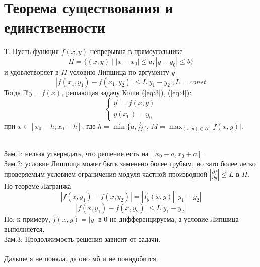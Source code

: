 \documentclass[14pt]{extarticle}
\begin{document}
\section{Теорема существования и единственности} 
Т. Пусть функция $f(x,y)$ непрерывна в прямоугольнике $$\Pi = 
\{(x,y) \mid  |x-x_0| \leq a, |y - y_0| \leq b\}$$ и удовлетворяет в $\Pi$
условию Липшица по аргументу $y$
$$|f(x_1, y_1) - f(x_1, y_2)| \leq L |y_1 - y_2|, L = const$$
Тогда $\exists ! y = f(x) $, решающая задачу Коши (\ref{eq:3}), (\ref{eq:4}):
\begin{equation*}
    \begin{cases}
        y^{'} = f(x, y)\\
        y(x_0) = y_0
    \end{cases}
\end{equation*}
при $x \in [x_0 - h, x_0 + h]$, где $h = \min\{a, \frac{b}{M}\}$, 
$M = \displaystyle \max_{(x,y)\in \Pi} |f(x,y)|$.\\
 \ \\
Зам.1: нельзя утверждать, что решение есть на $[x_0 - a, x_0 + a]$.\\
Зам.2: условие Липшица может быть заменено более грубым, но зато более
легко проверяемым условием ограничения модуля частной производной
$|\frac{\partial f}{\partial y}| \leq L $ в $\Pi$.\\
По теореме Лагранжа
$$|f(x, y_1) - f(x, y_2)| = |f^{'}_y(x,y)| \ |y_1 - y_2|$$
$$|f(x, y_1) - f(x, y_2)| \leq L |y_1 - y_2| $$
Но: к примеру, $f(x, y) = |y|$ в 0 не дифференцируема, а условие Липшица
выполняется. \\
Зам.3: Продолжимость решения зависит от задачи. 
\\\\
Дальше я не поняла, да оно мб и не понадобится. 
\end{document}
